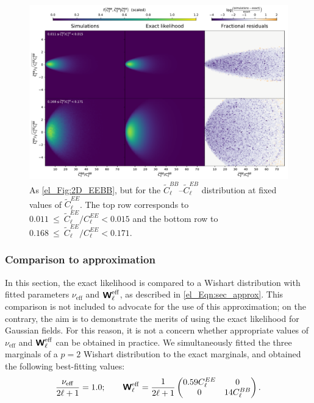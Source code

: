 \begin{figure}
    \includegraphics[width=\columnwidth]{2D_BBEB}
    \caption{As \autoref{el_Fig:2D_EEBB}, but for the $\widetilde{C}_\ell^{BB}$--$\widetilde{C}_\ell^{EB}$ distribution at fixed values of $\widetilde{C}_\ell^{EE}$. The top row corresponds to $0.011~\leq~\widetilde{C}_\ell^{EE} / C_\ell^{EE} < 0.015$ and the bottom row to $0.168~\leq~\widetilde{C}_\ell^{EE} / C_\ell^{EE} < 0.171$.}
    \label{el_Fig:2D_BBEB}
\end{figure}

\subsubsection{Comparison to approximation}

In this section, the exact likelihood is compared to a Wishart distribution with fitted parameters $\nu_\mathrm{eff}$ and $\bm{\mathsf{W}}_\ell^\mathrm{eff}$, as described in \autoref{el_Eqn:sec_approx}. This comparison is not included to advocate for the use of this approximation; on the contrary, the aim is to demonstrate the merits of using the exact likelihood for Gaussian fields. For this reason, it is not a concern whether appropriate values of $\nu_\mathrm{eff}$ and $\bm{\mathsf{W}}_\ell^\mathrm{eff}$ can be obtained in practice. We simultaneously fitted the three marginals of a $p=2$ Wishart distribution to the exact marginals, and obtained the following best-fitting values:
\begin{equation}
    \frac{\nu_\mathrm{eff}}{2 \ell + 1} = 1.0; \quad \quad
    \bm{\mathsf{W}}_\ell^\mathrm{eff} = \frac{1}{2 \ell + 1}
    \begin{pmatrix}
    0.59 C_\ell^{EE} & 0 \\
    0 & 14 C_\ell^{BB}
    \end{pmatrix}.
    \label{el_Eqn:wish_params}
\end{equation}

